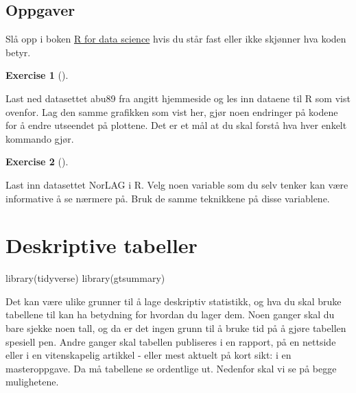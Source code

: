 \documentclass[
  letterpaper,
  DIV=11,
  numbers=noendperiod]{scrreprt}
\newenvironment{Shaded}{\begin{snugshade}}{\end{snugshade}}
\newcommand{\FunctionTok}[1]{\textcolor[rgb]{0.28,0.35,0.67}{#1}}
\newcommand{\NormalTok}[1]{\textcolor[rgb]{0.00,0.23,0.31}{#1}}
\theoremstyle{definition}
\newtheorem{exercise}{Exercise}[chapter]
\theoremstyle{remark}
\begin{document}
\hypertarget{oppgaver-2}{%
\section{Oppgaver}\label{oppgaver-2}}

Slå opp i boken \href{https://r4ds.had.co.nz/data-visualisation.html}{R
for data science} hvis du står fast eller ikke skjønner hva koden betyr.

\leavevmode{}%
\begin{exercise}[]\label{exr-}

Last ned datasettet abu89 fra angitt hjemmeside og les inn dataene til R
som vist ovenfor. Lag den samme grafikken som vist her, gjør noen
endringer på kodene for å endre utseendet på plottene. Det er et mål at
du skal forstå hva hver enkelt kommando gjør.

\end{exercise}

\leavevmode{}%
\begin{exercise}[]\label{exr-}

Last inn datasettet NorLAG i R. Velg noen variable som du selv tenker
kan være informative å se nærmere på. Bruk de samme teknikkene på disse
variablene.

\end{exercise}

\hypertarget{deskriptive-tabeller}{%
\chapter{Deskriptive tabeller}\label{deskriptive-tabeller}}

\begin{Shaded}
\begin{Highlighting}[]
\FunctionTok{library}\NormalTok{(tidyverse)}
\FunctionTok{library}\NormalTok{(gtsummary)}
\end{Highlighting}
\end{Shaded}

Det kan være ulike grunner til å lage deskriptiv statistikk, og hva du
skal bruke tabellene til kan ha betydning for hvordan du lager dem. Noen
ganger skal du bare sjekke noen tall, og da er det ingen grunn til å
bruke tid på å gjøre tabellen spesiell pen. Andre ganger skal tabellen
publiseres i en rapport, på en nettside eller i en vitenskapelig
artikkel - eller mest aktuelt på kort sikt: i en masteroppgave. Da må
tabellene se ordentlige ut. Nedenfor skal vi se på begge mulighetene.
\end{document}
